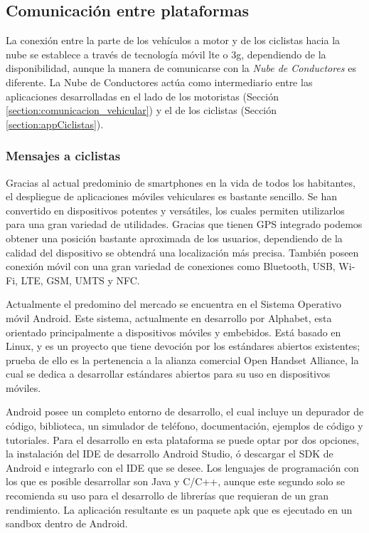 \subsection{Comunicación entre plataformas}\label{ssection:comunicacion_plataformas}
La conexión entre la parte de los vehículos a motor y de los ciclistas hacia la nube
se establece a través de tecnología móvil \gls{lte} o \gls{3g}, dependiendo de la
disponibilidad, aunque la manera de comunicarse con la \emph{Nube de Conductores} es
diferente. La Nube de Conductores actúa como intermediario entre las aplicaciones
desarrolladas en el lado de los motoristas (Sección \ref{section:comunicacion_vehicular})
y el de los ciclistas (Sección \ref{section:appCiclistas}).

\subsubsection{Mensajes a ciclistas}\label{sssection:mensajes_ciclistas}
Gracias al actual predominio de smartphones en la vida de todos los habitantes, el
despliegue de aplicaciones móviles vehiculares es bastante sencillo. Se han convertido
en dispositivos potentes y versátiles, los cuales permiten utilizarlos para una gran
variedad de utilidades. Gracias que tienen GPS integrado podemos obtener una posición
bastante aproximada de los usuarios, dependiendo de la calidad del dispositivo se obtendrá
una localización más precisa. También poseen conexión móvil con una gran variedad
de conexiones como Bluetooth, USB, Wi-Fi, LTE, GSM, UMTS y NFC.

Actualmente el predomino del mercado se encuentra en el Sistema Operativo móvil Android.
Este sistema, actualmente en desarrollo por Alphabet, esta orientado principalmente a
dispositivos móviles y embebidos. Está basado en Linux, y es un proyecto que tiene
devoción por los estándares abiertos existentes; prueba de ello es la pertenencia a
la alianza comercial Open Handset Alliance, la cual se dedica a desarrollar estándares
abiertos para su uso en dispositivos móviles.

Android posee un completo entorno de desarrollo, el cual incluye un depurador de
código, biblioteca, un simulador de teléfono, documentación, ejemplos de código y
tutoriales. Para el desarrollo en esta plataforma se puede optar por dos opciones, la
instalación del IDE de desarrollo Android Studio, ó descargar el SDK de Android e
integrarlo con el IDE que se desee. Los lenguajes de programación con los que es
posible desarrollar son Java y C/C++, aunque este segundo solo se recomienda su uso
para el desarrollo de librerías que requieran de un gran rendimiento. La aplicación
resultante es un paquete apk que es ejecutado en un sandbox dentro de Android.

